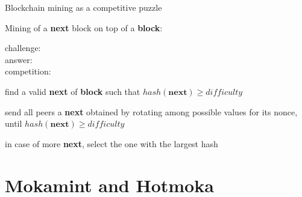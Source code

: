 \documentclass[11pt]{beamer}  %
\newcommand{\hash}{{\mathit{hash}}}
\newcommand{\difficulty}{{\mathit{difficulty}}}
\begin{document}
\begin{frame}{Blockchain mining as a competitive puzzle}

  Mining of a \textbf{next} block on top of a \textbf{block}:
  \quad{}

  \begin{description}
  \item[{\color{red}challenge:}] 
  \item[{\color{red}answer:}] 
  \item[{\color{red}competition:}] 
  \end{description}

  \bigskip
  \begin{description}
  \item<6->[{\color{red}challenge:}] find a valid \textbf{next} of \textbf{block}
    such that $\hash(\mathbf{next})\ge\difficulty$
  \item<7->[{\color{red}answer:}] send all peers a \textbf{next} obtained
    by rotating among possible values for its nonce, until $\hash(\mathbf{next})\ge\difficulty$
  \item<8->[{\color{red}competition:}] in case of more \textbf{next}, select the one with the largest hash
  \end{description}

\end{frame}

\section{Mokamint and Hotmoka}
\end{document}
